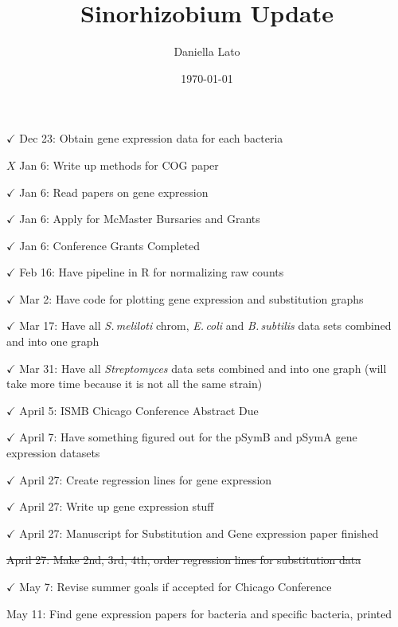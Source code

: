 \documentclass[12pt]{article}
\title{Sinorhizobium Update}
\author{Daniella Lato}
\date{\today}
\newcommand{\smel}{\textit{S.\,meliloti}\xspace}
\newcommand{\strep}{\textit{Streptomyces}\xspace}
\newcommand{\bass}{\textit{B.\,subtilis}\xspace}
\newcommand{\ecol}{\textit{E.\,coli}\xspace}
\newcommand{\pa}{pSymA\xspace}
\newcommand{\pb}{pSymB\xspace}
\begin{document}
$\checkmark$	Dec 23:	Obtain gene expression data for each bacteria
	

	
	
	
	
	
	
$X$	Jan 6: Write up methods for COG paper

$\checkmark$	Jan 6: Read papers on gene expression
	
$\checkmark$	Jan 6: Apply for McMaster Bursaries and Grants
	
$\checkmark$	Jan 6:	Conference Grants Completed	

$\checkmark$	Feb 16: Have pipeline in R for normalizing raw counts
	
$\checkmark$	Mar 2: Have code for plotting gene expression and substitution graphs
	
$\checkmark$	Mar 17: Have all \smel chrom, \ecol and \bass data sets combined and into one graph
	
$\checkmark$	Mar 31: Have all \strep data sets combined and into one graph (will take more time because it is not all the same strain)
	
$\checkmark$	April 5: ISMB Chicago Conference Abstract Due
	
$\checkmark$	April 7: Have something figured out for the \pb and \pa gene expression datasets

$\checkmark$	April 27: Create regression lines for gene expression
	
$\checkmark$	April 27: Write up gene expression stuff
	
$\checkmark$	April 27: Manuscript for Substitution and Gene expression paper finished
	
	\sout{April 27: Make 2nd, 3rd, 4th, order regression lines for substitution data}
	
$\checkmark$	May 7: Revise summer goals if accepted for Chicago Conference
	
	May 11: Find gene expression papers for bacteria and specific bacteria, printed
	
\end{document}
